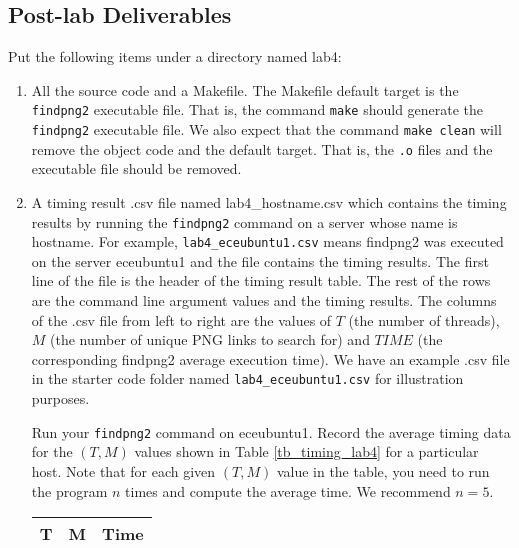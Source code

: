 \subsection{Post-lab Deliverables}
\label{sec:lab4:postlab}
Put the following items under a directory named lab4:
\begin{enumerate}
\item All the source code and a Makefile. The Makefile default target is the \verb+findpng2+ executable file. That is, the command \verb+make+ should generate the \verb+findpng2+ executable file. We also expect that the command \verb+make clean+ will remove the object code and the default target. That is, the \verb+.o+ files and the executable file should be removed.
\item A timing result .csv file named lab4\_hostname.csv 
  which contains the timing results by running the \verb+findpng2+ command on a server whose name is hostname. For example, \verb+lab4_eceubuntu1.csv+ means findpng2 was executed on the server eceubuntu1 and the file contains the timing results.
  The first line of the file is the header of the timing result table. The rest of the rows are the command line argument values and the timing results. The columns of the .csv file from left to right are the values of $T$ (the number of threads), $M$ (the number of unique PNG links to search for) and $TIME$ (the corresponding findpng2 average execution time). We have an example .csv file in the starter code folder named \verb+lab4_eceubuntu1.csv+ for illustration purposes.

Run your \verb+findpng2+ command on eceubuntu1. Record the average timing data for the $(T, M)$ values shown in Table \ref{tb_timing_lab4} for a particular host. Note that for each given $(T, M)$ value in the table, you need to run the program $n$ times and compute the average time. We recommend $n=5$.
\begin{table}[h]
\begin{center}
\begin{tabular}{|c|c|c|}
\hline
T     & M    & Time \\ \hline


\end{tabular}
\end{center}
\end{table}
\end{enumerate}
